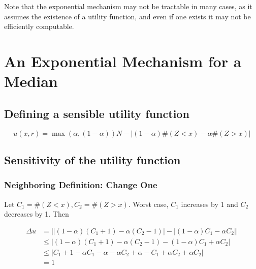 \documentclass[11pt]{scrartcl} %
\begin{document}
Note that the exponential mechanism may not be tractable in many cases, as it assumes the existence of a utility function, and even if one exists it may not be efficiently computable. 

\section{An Exponential Mechanism for a Median}

\subsection{Defining a sensible utility function}
%
%
%

\begin{equation}
u(x,r) = \max(\alpha, (1-\alpha))N - \left\vert (1-\alpha) \#(Z<x) - \alpha \# (Z>x) \right\vert 
\end{equation}

\subsection{Sensitivity of the utility function}

\subsubsection{Neighboring Definition: Change One}

Let $C_1 = \#(Z<x), C_2 = \#(Z>x)$. Worst case, $C_1$ increases by 1 and $C_2$ decreases by 1.
Then 

\begin{align*}
\Delta u &= \left\vert \left\vert (1-\alpha) (C_1 + 1) - \alpha (C_2-1) \right\vert - \left\vert (1-\alpha) C_1 - \alpha C_2 \right\vert \right\vert \\
 &\le \left\vert (1-\alpha) (C_1 + 1) - \alpha (C_2-1) - (1-\alpha) C_1 + \alpha C_2 \right\vert  \\
 &\le \left\vert C_1 + 1 - \alpha C_1 - \alpha - \alpha C_2 + \alpha - C_1 + \alpha C_2 + \alpha C_2 \right\vert  \\
 &= 1
\end{align*}
\end{document}
